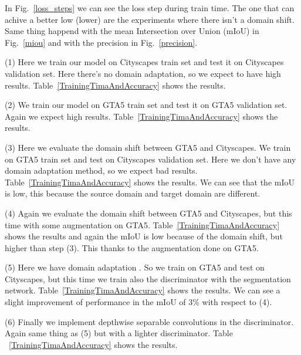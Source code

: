 \documentclass[conference]{IEEEtran}
\begin{document}
In Fig.~\ref{loss_steps} we can see the loss step during train time. The one that can achive a better low (lower) are the experiments
where there isn't a domain shift. Same thing happend with the mean Intersection over Union (mIoU) in Fig.~\ref{miou} and with the
precision in Fig.~\ref{precision}. 

(1) Here we train our model on Cityscapes train set and test it on Cityscapes validation set. Here there's no domain adaptation, so
we expect to have high results. Table~\ref{TrainingTimaAndAccuracy} shows the results.

(2) We train our model on GTA5 train set and test it on GTA5 validation set. Again we expect high results.
Table~\ref{TrainingTimaAndAccuracy} shows the results.

(3) Here we evaluate the domain shift between GTA5 and Cityscapes. We train on GTA5 train set and test on Cityscapes validation set.
Here we don't have any domain adaptation method, so we expect bad results. Table~\ref{TrainingTimaAndAccuracy} shows the results. We can
see that the mIoU is low, this because the source domain and target domain are different.

(4) Again we evaluate the domain shift between GTA5 and Cityscapes, but this time with some augmentation on GTA5. Table~\ref{TrainingTimaAndAccuracy}
shows the results and again the mIoU is low because of the domain shift, but higher than step (3). This thanks to the augmentation
done on GTA5.

(5) Here we have domain adaptation \cite{b3}. So we train on GTA5 and test on Cityscapes, but this time we train also the discriminator
with the segmentation network. Table~\ref{TrainingTimaAndAccuracy} shows the results. We can see a slight improvement of performance
in the mIoU of 3\% with respect to (4).

(6) Finally we implement depthwise separable convolutions in the discriminator. Again same thing as (5) but with a lighter discriminator. Table
~\ref{TrainingTimaAndAccuracy} shows the results.
\end{document}
